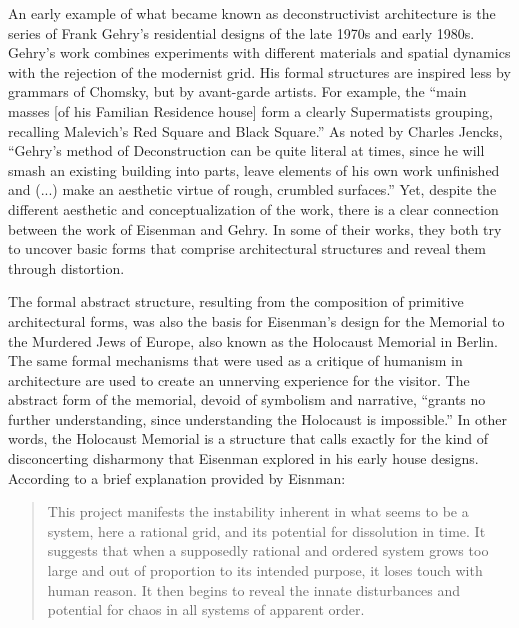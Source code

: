An early example of what became known as deconstructivist architecture is the series of Frank
Gehry's residential designs of the late 1970s and early 1980s. Gehry's work combines
experiments with different materials and spatial dynamics with the rejection of the modernist
grid.
His formal structures are inspired less by grammars of Chomsky, but by avant-garde artists.
For example, the ``main masses [of his Familian Residence house] form a clearly Supermatists
grouping, recalling Malevich's Red Square and Black Square.''
As noted by Charles Jencks, ``Gehry’s method of Deconstruction can be quite literal at
times, since he will smash an existing building into parts, leave elements of his own work
unfinished and (...) make an aesthetic virtue of rough, crumbled surfaces.'' Yet, despite the different aesthetic and conceptualization
of the work, there is a clear connection between the work of Eisenman and Gehry. In some of their
works, they both try to uncover basic forms that comprise architectural structures and reveal them
through distortion.

The formal abstract structure, resulting from the composition of primitive architectural forms,
was also the basis for Eisenman's design for the Memorial to the Murdered Jews of Europe,
also known as the Holocaust Memorial in Berlin. The same formal mechanisms that were used as
a critique of humanism in architecture are used to create an unnerving experience for the
visitor.
The abstract form of the memorial, devoid of symbolism and narrative, ``grants no further
understanding, since understanding the Holocaust is impossible.''
In other words, the Holocaust Memorial is a structure that calls exactly for the kind of
disconcerting disharmony that Eisenman explored in his early house designs. According to
a brief explanation provided by Eisnman:

\begin{quote}
This project manifests the instability inherent in what seems to be a system, here a
rational grid, and its potential for dissolution in time. It suggests that when a supposedly
rational and ordered system grows too large and out of proportion to its intended purpose,
it loses touch with human reason. It then begins to reveal the innate disturbances and potential
for chaos in all systems of apparent order.
\end{quote}

